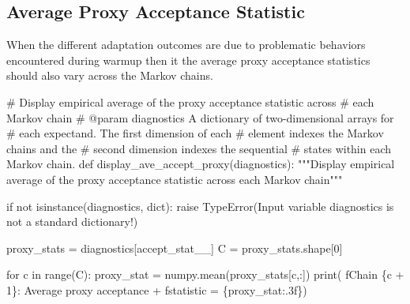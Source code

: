 \documentclass[
  letterpaper,
  DIV=11,
  numbers=noendperiod]{scrartcl}
\newenvironment{Shaded}{\begin{snugshade}}{\end{snugshade}}
\newcommand{\BuiltInTok}[1]{\textcolor[rgb]{0.00,0.23,0.31}{#1}}
\newcommand{\CommentTok}[1]{\textcolor[rgb]{0.37,0.37,0.37}{#1}}
\newcommand{\ControlFlowTok}[1]{\textcolor[rgb]{0.00,0.23,0.31}{#1}}
\newcommand{\DecValTok}[1]{\textcolor[rgb]{0.68,0.00,0.00}{#1}}
\newcommand{\KeywordTok}[1]{\textcolor[rgb]{0.00,0.23,0.31}{#1}}
\newcommand{\NormalTok}[1]{\textcolor[rgb]{0.00,0.23,0.31}{#1}}
\newcommand{\OperatorTok}[1]{\textcolor[rgb]{0.37,0.37,0.37}{#1}}
\newcommand{\PreprocessorTok}[1]{\textcolor[rgb]{0.68,0.00,0.00}{#1}}
\newcommand{\SpecialCharTok}[1]{\textcolor[rgb]{0.37,0.37,0.37}{#1}}
\newcommand{\SpecialStringTok}[1]{\textcolor[rgb]{0.13,0.47,0.30}{#1}}
\newcommand{\StringTok}[1]{\textcolor[rgb]{0.13,0.47,0.30}{#1}}
\begin{document}
\subsection{Average Proxy Acceptance
Statistic}\label{average-proxy-acceptance-statistic}

When the different adaptation outcomes are due to problematic behaviors
encountered during warmup then it the average proxy acceptance
statistics should also vary across the Markov chains.

\begin{Shaded}
\begin{Highlighting}[]
\CommentTok{\# Display empirical average of the proxy acceptance statistic across}
\CommentTok{\# each Markov chain}
\CommentTok{\# @param diagnostics A dictionary of two{-}dimensional arrays for}
\CommentTok{\#                    each expectand.  The first dimension of each}
\CommentTok{\#                    element indexes the Markov chains and the}
\CommentTok{\#                    second dimension indexes the sequential}
\CommentTok{\#                    states within each Markov chain.}
\KeywordTok{def}\NormalTok{ display\_ave\_accept\_proxy(diagnostics):}
  \CommentTok{"""Display empirical average of the proxy acceptance statistic}
\CommentTok{     across each Markov chain"""}
     
  \ControlFlowTok{if} \KeywordTok{not} \BuiltInTok{isinstance}\NormalTok{(diagnostics, }\BuiltInTok{dict}\NormalTok{):}
    \ControlFlowTok{raise} \PreprocessorTok{TypeError}\NormalTok{(}\StringTok{\textquotesingle{}Input variable \textasciigrave{}diagnostics\textasciigrave{} is not a standard dictionary!\textquotesingle{}}\NormalTok{)}
  
\NormalTok{  proxy\_stats }\OperatorTok{=}\NormalTok{ diagnostics[}\StringTok{\textquotesingle{}accept\_stat\_\_\textquotesingle{}}\NormalTok{]}
\NormalTok{  C }\OperatorTok{=}\NormalTok{ proxy\_stats.shape[}\DecValTok{0}\NormalTok{]}
  
  \ControlFlowTok{for}\NormalTok{ c }\KeywordTok{in} \BuiltInTok{range}\NormalTok{(C):}
\NormalTok{    proxy\_stat }\OperatorTok{=}\NormalTok{ numpy.mean(proxy\_stats[c,:])}
    \BuiltInTok{print}\NormalTok{(  }\SpecialStringTok{f\textquotesingle{}Chain }\SpecialCharTok{\{}\NormalTok{c }\OperatorTok{+} \DecValTok{1}\SpecialCharTok{\}}\SpecialStringTok{: Average proxy acceptance \textquotesingle{}}
          \OperatorTok{+} \SpecialStringTok{f\textquotesingle{}statistic = }\SpecialCharTok{\{}\NormalTok{proxy\_stat}\SpecialCharTok{:.3f\}}\SpecialStringTok{\textquotesingle{}}\NormalTok{)}
\end{Highlighting}
\end{Shaded}
\end{document}
